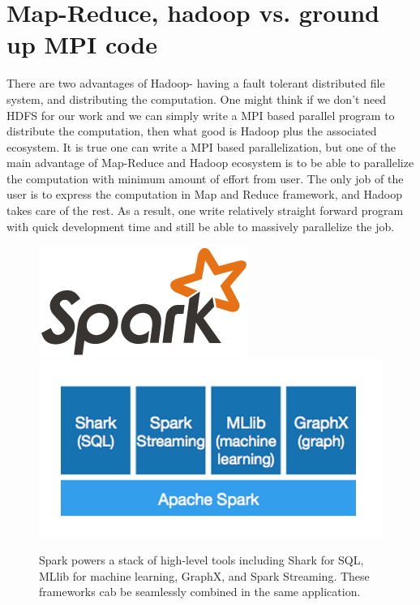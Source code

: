 \documentclass[twocolumn, prd]{revtex4}
\begin{document}
\section{Map-Reduce, hadoop vs. ground up MPI code}
There are two advantages of Hadoop- having a fault tolerant distributed file system, and distributing the computation. One might think if we don't need HDFS for our work and we can simply write a MPI based parallel program to distribute the computation, then what good is Hadoop plus the associated ecosystem. It is true one can write a MPI based parallelization, but one of the main advantage of  Map-Reduce and Hadoop ecosystem is to be able to parallelize the computation with minimum amount of effort from user. The only job of the user is to express the computation in Map and Reduce framework, and Hadoop takes care of the rest. As a result, one write relatively straight forward program with quick development time and still be able to massively parallelize the job.
\begin{figure}
\includegraphics[width=0.4\linewidth]{spark-logo}
\includegraphics[width=\linewidth]{spark.png}
\caption{Spark powers a stack of high-level tools including Shark for SQL, MLlib for machine learning, GraphX, and Spark Streaming. These frameworks  cab be seamlessly combined in the same application.}
\end{figure}
\end{document}
